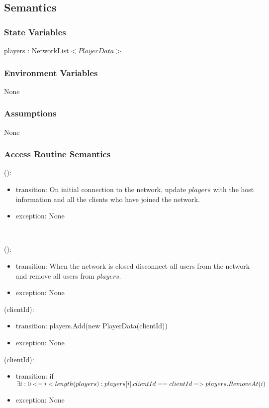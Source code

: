 \documentclass[12pt, titlepage]{article}
\begin{document}
\subsection{Semantics}

\subsubsection{State Variables}

players : NetworkList$<PlayerData>$

\subsubsection{Environment Variables}

None

\subsubsection{Assumptions}

None

\subsubsection{Access Routine Semantics}

():
\begin{itemize}
\item transition: On initial connection to the network, update $players$ with the host information and all the clients who have joined the network.
\item exception: None
\end{itemize}\

():
\begin{itemize}
\item transition: When the network is closed disconnect all users from the network and remove all users from $players$.
\item exception: None
\end{itemize}

(clientId):
\begin{itemize}
\item transition: players.Add(new PlayerData(clientId))
\item exception: None
\end{itemize}

(clientId):
\begin{itemize}
\item transition: if $  \exists i: 0 <= i < length(players) : \newline players[i].clientId == clientId => players.RemoveAt(i) $
\item exception: None
\end{itemize}
\end{document}
